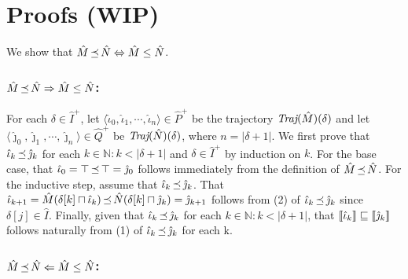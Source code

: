 \section{Proofs (WIP)}

We show that $\hat M \operatorname{\preceq} \hat N \Leftrightarrow \hat M \leq \hat N$.

\subsubsection{$\hat M \operatorname{\preceq} \hat N \Rightarrow \hat M \leq \hat N$:} For each $\delta \in \hat I^{+}$, let $\langle \hat \iota_{0}, \hat \iota_{1}, \cdots, \hat \iota_{n} \rangle \in \hat P^{+}$ be the trajectory $\textit{Traj}(\hat M)(\delta)$ and let $\langle \hat \jmath_{0}, \hat \jmath_{1}, \cdots, \hat \jmath_{n} \rangle \in \hat Q^{+}$ be $\textit{Traj}(\hat N)(\delta)$, where $n = | \delta + 1|$. We first prove that $\hat \iota_{k} \operatorname{\preceq} \hat \jmath_{k}$ for each $k \in \mathbb{N} : k < | \delta + 1 |$ and $\delta \in \hat I^{+}$ by induction on $k$. For the base case, that $\hat \iota_{0} = \top \operatorname{\preceq} \top = \hat \jmath_{0}$ follows immediately from the definition of $\hat M \operatorname{\preceq} \hat N$. For the inductive step, assume that $\hat \iota_{k} \operatorname{\preceq} \hat \jmath_{k}$. That $\hat \iota_{k+1} = \hat M(\delta[k] \sqcap \hat \iota_{k}) \operatorname{\preceq} \hat N(\delta[k] \sqcap \hat \jmath_{k}) = \hat \jmath_{k+1}$ follows from (2) of $\hat \iota_{k} \operatorname{\preceq} \hat \jmath_{k}$ since $\delta[j] \in \hat I$. Finally, given that $\hat \iota_{k} \operatorname{\preceq} \hat \jmath_{k}$ for each $k \in \mathbb{N} : k < | \delta + 1 |$, that $\llbracket\hat \iota_{k}\rrbracket \sqsubseteq \llbracket\hat \jmath_{k}\rrbracket$ follows naturally from (1) of $\hat \iota_{k} \operatorname{\preceq} \hat \jmath_{k}$ for each k.


\subsubsection{$\hat M \operatorname{\preceq} \hat N \Leftarrow \hat M \leq \hat N$:} 

